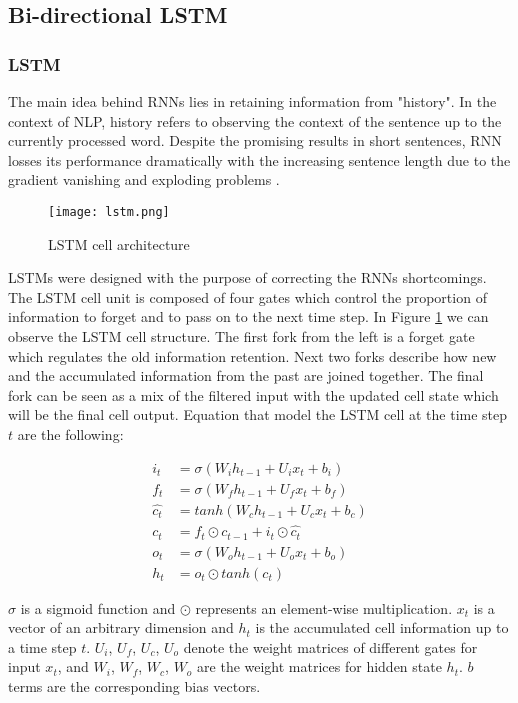 \subsection{Bi-directional LSTM}

\subsubsection{LSTM}
The main idea behind RNNs lies in retaining information from "history".
In the context of NLP, history refers to observing the context of the
sentence up to the currently processed word. Despite the promising results in short
sentences, RNN losses its performance dramatically with the increasing sentence
length due to the gradient vanishing\cite{bengio1994learning}
and exploding problems \cite{pascanu2013difficulty}.

\begin{figure}
  \caption{LSTM cell architecture}
  \label{fig:lstm}
  \centering
    \texttt{[image: lstm.png]}
\end{figure}

LSTMs were designed with the purpose of correcting the RNNs shortcomings. The LSTM
cell unit is composed of four gates which control the proportion of
information to forget and to pass on to the next time step. In Figure
\ref{fig:lstm} we can observe the LSTM cell structure. The first fork from the left
is a forget gate which regulates the old information retention. Next two forks 
describe how new and the accumulated information from the past are joined
together. The final fork can be seen as a mix of the filtered input with the
updated cell state which will be the final cell output. Equation that model the
LSTM cell at the time step $t$ are the following:

\begin{align*}
        i_t &= \sigma\left(W_ih_{t-1} + U_{i}x_t + b_i\right)\\
        f_t &= \sigma\left(W_fh_{t-1} + U_{f}x_t + b_f\right)\\
        \hat{c_t} &= tanh\left(W_ch_{t-1} + U_{c}x_t + b_c\right)\\
        c_t &=  f_t \odot c_{t-1} + i_t \odot \hat{c_t}\\
        o_t &= \sigma\left(W_oh_{t-1} + U_{o}x_t + b_o\right)\\
        h_t &= o_t \odot tanh(c_t)
\end{align*}

$\sigma$ is a sigmoid function and $\odot$ represents an element-wise
multiplication. $x_t$ is a vector of an arbitrary dimension and $h_t$ is the
accumulated cell information up to a time step $t$. $U_i$, $U_f$, $U_c$, $U_o$
denote the weight matrices of different gates for input $x_t$, and
$W_i$, $W_f$, $W_c$, $W_o$ are the weight matrices for hidden state $h_t$.
$b$ terms are the corresponding bias vectors.

